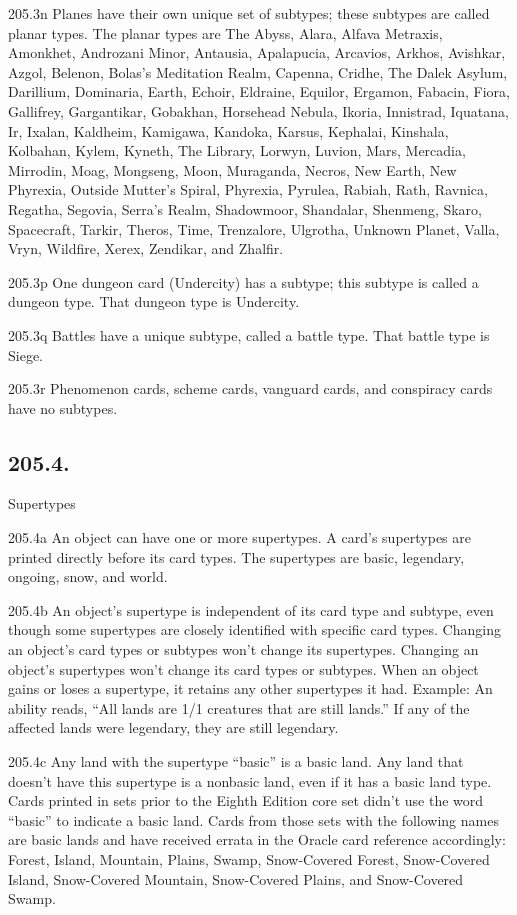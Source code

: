 205.3n Planes have their own unique set of subtypes; these subtypes are called planar types. The planar types are The Abyss, Alara, Alfava Metraxis, Amonkhet, Androzani Minor, Antausia, Apalapucia, Arcavios, Arkhos, Avishkar, Azgol, Belenon, Bolas’s Meditation Realm, Capenna, Cridhe, The Dalek Asylum, Darillium, Dominaria, Earth, Echoir, Eldraine, Equilor, Ergamon, Fabacin, Fiora, Gallifrey, Gargantikar, Gobakhan, Horsehead Nebula, Ikoria, Innistrad, Iquatana, Ir, Ixalan, Kaldheim, Kamigawa, Kandoka, Karsus, Kephalai, Kinshala, Kolbahan, Kylem, Kyneth, The Library, Lorwyn, Luvion, Mars, Mercadia, Mirrodin, Moag, Mongseng, Moon, Muraganda, Necros, New Earth, New Phyrexia, Outside Mutter’s Spiral, Phyrexia, Pyrulea, Rabiah, Rath, Ravnica, Regatha, Segovia, Serra’s Realm, Shadowmoor, Shandalar, Shenmeng, Skaro, Spacecraft, Tarkir, Theros, Time, Trenzalore, Ulgrotha, Unknown Planet, Valla, Vryn, Wildfire, Xerex, Zendikar, and Zhalfir.

205.3p One dungeon card (Undercity) has a subtype; this subtype is called a dungeon type. That dungeon type is Undercity.

205.3q Battles have a unique subtype, called a battle type. That battle type is Siege.

205.3r Phenomenon cards, scheme cards, vanguard cards, and conspiracy cards have no subtypes.

\subsection*{205.4.}
Supertypes

205.4a An object can have one or more supertypes. A card’s supertypes are printed directly before its card types. The supertypes are basic, legendary, ongoing, snow, and world.

205.4b An object’s supertype is independent of its card type and subtype, even though some supertypes are closely identified with specific card types. Changing an object’s card types or subtypes won’t change its supertypes. Changing an object’s supertypes won’t change its card types or subtypes. When an object gains or loses a supertype, it retains any other supertypes it had.
Example: An ability reads, “All lands are 1/1 creatures that are still lands.” If any of the affected lands were legendary, they are still legendary.

205.4c Any land with the supertype “basic” is a basic land. Any land that doesn’t have this supertype is a nonbasic land, even if it has a basic land type.
Cards printed in sets prior to the Eighth Edition core set didn’t use the word “basic” to indicate a basic land. Cards from those sets with the following names are basic lands and have received errata in the Oracle card reference accordingly: Forest, Island, Mountain, Plains, Swamp, Snow-Covered Forest, Snow-Covered Island, Snow-Covered Mountain, Snow-Covered Plains, and Snow-Covered Swamp.

